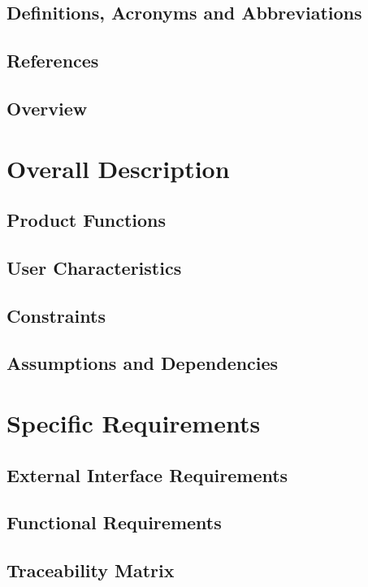 \documentclass{article}
\begin{document}
  \clearpage
	\subsection{Definitions, Acronyms and Abbreviations}
	
	
	\subsection{References}
	
	
	\subsection{Overview}
	

\clearpage
\section{Overall Description}

	\subsection{Product Functions}
	
	
	\subsection{User Characteristics}
	
	
	\subsection{Constraints}
	
	
	\subsection{Assumptions and Dependencies}
	
	
\clearpage
\section{Specific Requirements}
	\subsection{External Interface Requirements}
	
	
	\clearpage
	\subsection{Functional Requirements}
	

	\subsection{Traceability Matrix}
		
\end{document}
